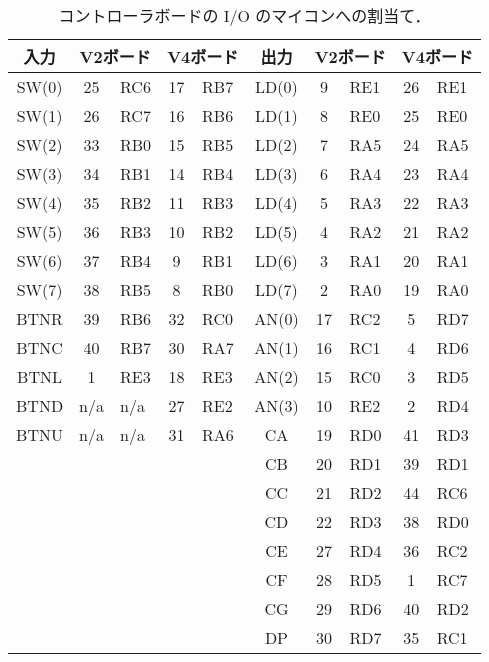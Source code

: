\begin{table}[ht]
 \centering
  \caption{コントローラボードの I/O のマイコンへの割当て．}
  \label{table:pic_io}
  \begin{tabular}{c|c|l|c|l||c|c|l|c|l} \hline
   入力 & \multicolumn{2}{c|}{V2ボード} & \multicolumn{2}{c||}{V4ボード} &
   出力 & \multicolumn{2}{c|}{V2ボード} & \multicolumn{2}{c}{V4ボード} \\ \hline \hline
   SW(0) & 25  & RC6 & 17 & RB7 & LD(0) &  9  & RE1 & 26 & RE1 \\
   SW(1) & 26  & RC7 & 16 & RB6 & LD(1) &  8  & RE0 & 25 & RE0 \\
   SW(2) & 33  & RB0 & 15 & RB5 & LD(2) &  7  & RA5 & 24 & RA5 \\
   SW(3) & 34  & RB1 & 14 & RB4 & LD(3) &  6  & RA4 & 23 & RA4 \\
   SW(4) & 35  & RB2 & 11 & RB3 & LD(4) &  5  & RA3 & 22 & RA3 \\
   SW(5) & 36  & RB3 & 10 & RB2 & LD(5) &  4  & RA2 & 21 & RA2 \\
   SW(6) & 37  & RB4 &  9 & RB1 & LD(6) &  3  & RA1 & 20 & RA1 \\
   SW(7) & 38  & RB5 &  8 & RB0 & LD(7) &  2  & RA0 & 19 & RA0 \\
   BTNR  & 39  & RB6 & 32 & RC0 & AN(0) & 17  & RC2 &  5 & RD7 \\
   BTNC  & 40  & RB7 & 30 & RA7 & AN(1) & 16  & RC1 &  4 & RD6 \\
   BTNL  &  1  & RE3 & 18 & RE3 & AN(2) & 15  & RC0 &  3 & RD5 \\
   BTND  & n/a & n/a & 27 & RE2 & AN(3) & 10  & RE2 &  2 & RD4 \\
   BTNU  & n/a & n/a & 31 & RA6 & CA    & 19  & RD0 & 41 & RD3 \\
         &     &     &    &     & CB    & 20  & RD1 & 39 & RD1 \\
         &     &     &    &     & CC    & 21  & RD2 & 44 & RC6 \\
         &     &     &    &     & CD    & 22  & RD3 & 38 & RD0 \\
         &     &     &    &     & CE    & 27  & RD4 & 36 & RC2 \\
         &     &     &    &     & CF    & 28  & RD5 &  1 & RC7 \\
         &     &     &    &     & CG    & 29  & RD6 & 40 & RD2 \\
         &     &     &    &     & DP    & 30  & RD7 & 35 & RC1 \\ \hline
 \end{tabular}
\end{table}


